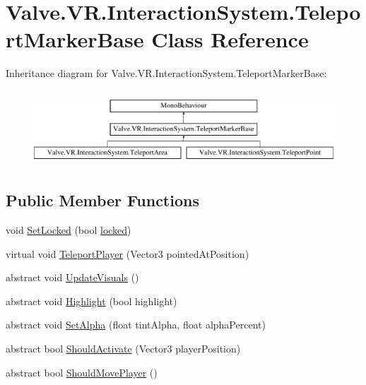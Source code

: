 \hypertarget{class_valve_1_1_v_r_1_1_interaction_system_1_1_teleport_marker_base}{}\section{Valve.\+V\+R.\+Interaction\+System.\+Teleport\+Marker\+Base Class Reference}
\label{class_valve_1_1_v_r_1_1_interaction_system_1_1_teleport_marker_base}
Inheritance diagram for Valve.\+V\+R.\+Interaction\+System.\+Teleport\+Marker\+Base\+:\begin{figure}[H]
\begin{center}
\leavevmode
\includegraphics[height=2.837838cm]{class_valve_1_1_v_r_1_1_interaction_system_1_1_teleport_marker_base}
\end{center}
\end{figure}
\subsection*{Public Member Functions}
\begin{DoxyCompactItemize}
\item 
void \mbox{\hyperlink{class_valve_1_1_v_r_1_1_interaction_system_1_1_teleport_marker_base_a87c960b35fe852c32df75c7fda798c75}{Set\+Locked}} (bool \mbox{\hyperlink{class_valve_1_1_v_r_1_1_interaction_system_1_1_teleport_marker_base_a0fe663ebf0fb74cfb7d6f5ca28c83493}{locked}})
\item 
virtual void \mbox{\hyperlink{class_valve_1_1_v_r_1_1_interaction_system_1_1_teleport_marker_base_a07a9c6f37fddd135dd3ef98c55dc892b}{Teleport\+Player}} (Vector3 pointed\+At\+Position)
\item 
abstract void \mbox{\hyperlink{class_valve_1_1_v_r_1_1_interaction_system_1_1_teleport_marker_base_a5faad5c973035110d88fec8ed93e91ff}{Update\+Visuals}} ()
\item 
abstract void \mbox{\hyperlink{class_valve_1_1_v_r_1_1_interaction_system_1_1_teleport_marker_base_ab2505033275992613453b17981dd4053}{Highlight}} (bool highlight)
\item 
abstract void \mbox{\hyperlink{class_valve_1_1_v_r_1_1_interaction_system_1_1_teleport_marker_base_a0f8f7a7f338cea092cbe1e9e1c12d4f2}{Set\+Alpha}} (float tint\+Alpha, float alpha\+Percent)
\item 
abstract bool \mbox{\hyperlink{class_valve_1_1_v_r_1_1_interaction_system_1_1_teleport_marker_base_a8c5bd9c4fad8bbfcd4cca509bd76e375}{Should\+Activate}} (Vector3 player\+Position)
\item 
abstract bool \mbox{\hyperlink{class_valve_1_1_v_r_1_1_interaction_system_1_1_teleport_marker_base_ae58e1036576aa8b913ad958bd294cd6f}{Should\+Move\+Player}} ()
\end{DoxyCompactItemize}
